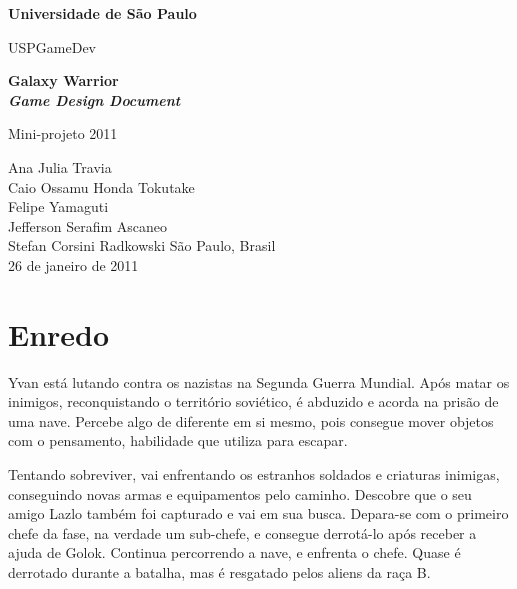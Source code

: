 \documentclass[12pt, a4paper]{article}
\begin{document}
\thispagestyle{empty}
    \begin{center}
        \textbf{\LARGE{Universidade de São Paulo}}
        \vspace*{0.5 cm}

        {\LARGE{USPGameDev}}
        
        \vspace*{3.0 cm}
        \textbf{\large{Galaxy Warrior\\
                \emph{Game Design Document}}}
    \end{center}

    \vskip 3cm

    \begin{flushright}
        Mini-projeto 2011

        \vskip 3cm

    \end{flushright}
    \vskip 3.5cm

    \begin{center}
        Ana Julia Travia\\
        Caio Ossamu Honda Tokutake\\
        Felipe Yamaguti\\
        Jefferson Serafim Ascaneo\\
        Stefan Corsini Radkowski
        \vskip 1cm
        São Paulo, Brasil\\
        26 de janeiro de 2011
    \end{center}
\pagebreak

\tableofcontents
\pagebreak

\section{Enredo}
    Yvan está lutando contra os nazistas na Segunda Guerra Mundial. Após matar
    os inimigos, reconquistando o território soviético, é abduzido e acorda
    na prisão de uma nave. Percebe algo de diferente em si mesmo, pois consegue
    mover objetos com o pensamento, habilidade que utiliza para escapar.

    Tentando sobreviver, vai enfrentando os estranhos soldados e criaturas inimigas,
    conseguindo novas armas e equipamentos pelo caminho. Descobre que o seu amigo 
    Lazlo também foi capturado e vai em sua busca. Depara-se com o primeiro chefe
    da fase, na verdade um sub-chefe, e consegue derrotá-lo após receber a ajuda
    de Golok. Continua percorrendo a nave, e enfrenta o chefe. Quase é derrotado
    durante a batalha, mas é resgatado pelos aliens da raça B.
\end{document}
